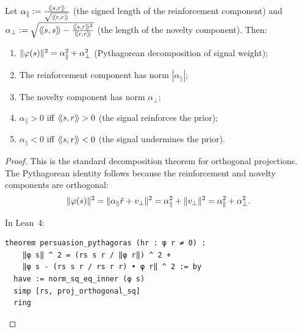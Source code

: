 \begin{theorem}
\label{thm:persuasion-components}
Let $\alpha_\parallel := \frac{\langle\!\langle s, r \rangle\!\rangle}{\sqrt{\langle\!\langle r, r \rangle\!\rangle}}$ (the signed length
of the reinforcement component) and $\alpha_\perp := \sqrt{\langle\!\langle s, s \rangle\!\rangle -
\frac{\langle\!\langle s, r \rangle\!\rangle^2}{\langle\!\langle r, r \rangle\!\rangle}}$ (the length of the novelty component). Then:
\begin{enumerate}
\item $\lVert \varphi(s) \rVert^2 = \alpha_\parallel^2 + \alpha_\perp^2$ (Pythagorean
decomposition of signal weight);
\item The reinforcement component has norm $|\alpha_\parallel|$;
\item The novelty component has norm $\alpha_\perp$;
\item $\alpha_\parallel > 0$ iff $\langle\!\langle s, r \rangle\!\rangle > 0$ (the signal reinforces the
prior);
\item $\alpha_\parallel < 0$ iff $\langle\!\langle s, r \rangle\!\rangle < 0$ (the signal undermines the
prior).
\end{enumerate}
\end{theorem}

\begin{proof}
This is the standard decomposition theorem for orthogonal projections. The
Pythagorean identity follows because the reinforcement and novelty components
are orthogonal:
\[
  \lVert \varphi(s) \rVert^2 = \lVert \alpha_\parallel \hat{r} + v_\perp \rVert^2
  = \alpha_\parallel^2 + \lVert v_\perp \rVert^2 = \alpha_\parallel^2 + \alpha_\perp^2.
\]

In Lean~4:
\begin{lstlisting}
theorem persuasion_pythagoras (hr : φ r ≠ 0) :
    ‖φ s‖ ^ 2 = (rs s r / ‖φ r‖) ^ 2 +
    ‖φ s - (rs s r / rs r r) • φ r‖ ^ 2 := by
  have := norm_sq_eq_inner (φ s)
  simp [rs, proj_orthogonal_sq]
  ring
\end{lstlisting}
\end{proof}

